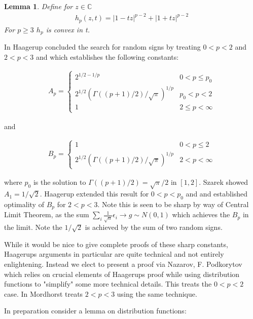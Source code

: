\documentclass[10pt]{article}
\newcommand{\1}{\textbf{1}}
\newcommand{\C}{\mathbb{C}}
\newtheorem{lemma}[theorem]{Lemma}
\theoremstyle{remark}
\theoremstyle{definition}
\begin{document}
\begin{lemma}
	Define for $z \in \C$
	\begin{align*}
		h_p(z,t) = |1-tz|^{p-2} + |1+tz|^{p-2} 
	\end{align*}
	For $p \geq 3$ $h_p$ is convex in t.
\end{lemma}


In \cite{H} Haagerup concluded the search for random signs by treating $0 < p < 2$ and $2 < p < 3$ and which establishes the following constants:


\begin{align*}
	A_p = 
	\begin{cases}
		2^{1/2-1/p} & 0 < p \leq p_0 \\
		2^{1/2}(\Gamma((p+1)/2)/\sqrt{\pi})^{1/p} & p_0 < p < 2\\
		1 & 2 \leq p < \infty
	\end{cases}
\end{align*}

and 

\begin{align*}
	B_p = 
	\begin{cases}
		1 & 0 < p \leq 2\\
		2^{1/2}(\Gamma((p+1)/2)/\sqrt{\pi})^{1/p} & 2 < p < \infty
	\end{cases}
\end{align*}

where $p_0$ is the solution to $\Gamma((p+1)/2) = \sqrt{\pi}/2$ in $[1,2]$. Szarek \cite{S} showed $A_1 = 1/\sqrt{2}$. Haagerup extended this result for $0 < p < p_0$ and and established optimality of $B_p$ for $2 < p <3$. Note this is seen to be sharp by way of Central Limit Theorem, as the sum $\sum_i \frac{1}{\sqrt{n}}\epsilon_i \to g \sim N(0,1)$ which achieves the $B_p$ in the limit. Note the $1/\sqrt{2}$ is achieved by the sum of two random signs.

While it would be nice to give complete proofs of these sharp constants, Haagerups arguments in particular are quite technical and not entirely enlightening. Instead we elect to present a proof via Nazarov, F. Podkorytov \cite{NP} which relies on crucial elements of Haagerups proof while using distribution functions to "simplify" some more technical details. This treats the $0 < p <2$ case. In \cite{M} Mordhorst treats $2 < p < 3$ using the same technique.

In preparation consider a lemma on distribution functions:
\end{document}
